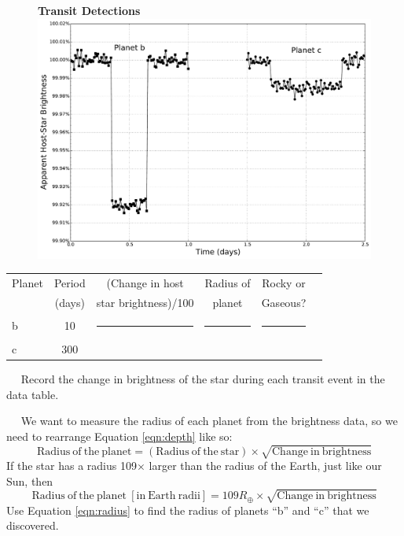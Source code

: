 \documentclass[12pt]{article}
\newcommand{\question}[1]{\vspace{10mm} \noindent {\bf #1)}~~}
\begin{document}
\begin{figure}[h!]
\centering
{\bf Transit Detections} \\
\includegraphics[scale=0.5]{plots/faketransit.pdf}
\end{figure}

\vfill

\begin{table}[h!]
\centering
\begin{tabular}{|l |c |c| c| c| c|}
\hline
Planet & Period & (Change in host & Radius of & Rocky or  \\
 & (days) & star brightness)/100  &  planet  &  Gaseous? \\ \hline
b & 10 & \rule{0pt}{1.5cm} \rule{4cm}{0pt} & \rule{4cm}{0pt} & \rule{4cm}{0pt}\\ \hline
c & 300 & \rule{0pt}{1.5cm} & &\\ \hline
\end{tabular}
\end{table}

\pagebreak

\question{1} Record the change in brightness of the star during each transit event in the data table. 

\question{2} We want to measure the radius of each planet from the brightness data, so we need to rearrange Equation \ref{eqn:depth} like so:
\begin{equation}
\mathrm{Radius~of~the~planet} = \left( \mathrm{Radius~of~the~star} \right) \times \sqrt{\mathrm{Change~in~brightness}}
\end{equation}
If the star has a radius 109$\times$ larger than the radius of the Earth, just like our Sun, then 
\begin{equation}
\mathrm{Radius~of~the~planet~[in~Earth~radii]} = 109R_\oplus  \times \sqrt{\mathrm{Change~in~brightness}} \label{eqn:radius}
\end{equation}
Use Equation \ref{eqn:radius} to find the radius of planets ``b'' and ``c'' that we discovered. 
\end{document}

